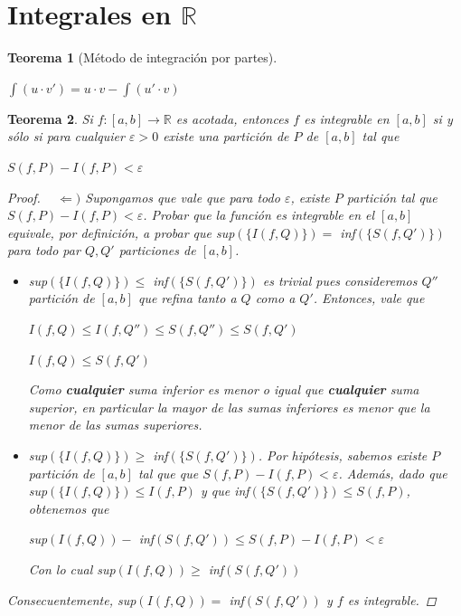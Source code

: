\documentclass[]{article}
\newtheorem{teo}{Teorema}
\def\R{\mathbb{R}}
\def\e{\varepsilon}
\begin{document}
\newpage
\section{Integrales en $\R$}
\begin{teo}[Método de integración por partes]
	~\newline
	\begin{center}
		$\displaystyle \int \! (u\cdot v') = u\cdot v - \int\!(u'\cdot v)$
	\end{center}
\end{teo}

\begin{teo}
	Si $f:[a,b]\to\R$ es acotada, entonces $f$ es integrable en $[a,b]$ si y sólo si para cualquier $\e >0$ existe una partición de $P$ de $[a,b]$ tal que 
	\begin{center}
		$S(f,P) - I(f,P) < \e$
	\end{center}
	\begin{proof}
		~\newline
		$\Leftarrow)$ Supongamos que vale que para todo $\e$, existe $P$ partición tal que $S(f,P) - I(f,P)<\e$. Probar que la función es integrable en el $[a,b]$ equivale, por definición, a probar que sup$(\{I(f,Q)\}) = $ inf$(\{S(f,Q')\})$ para todo par $Q,Q'$ particiones de $[a,b]$.
		\begin{itemize}
			\item sup$(\{I(f,Q)\}) \leq $ inf$(\{S(f,Q')\})$ es trivial pues consideremos $Q''$ partición de $[a,b]$ que refina tanto a $Q$ como a $Q'$. Entonces, vale que 
			\begin{center}
				$I(f,Q) \leq I(f,Q'') \leq S(f,Q'') \leq S(f,Q')$
			\end{center}
			\begin{center}
				$I(f,Q) \leq S(f,Q')$
			\end{center}
			Como \textbf{cualquier} suma inferior es menor o igual que \textbf{cualquier} suma superior, en particular la mayor de las sumas inferiores es menor que la menor de las sumas superiores.
			
			\item sup$(\{I(f,Q)\}) \geq $ inf$(\{S(f,Q')\})$. Por hipótesis, sabemos existe $P$ partición de $[a,b]$ tal que que $S(f,P) - I(f,P) < \e$. Además, dado que sup$(\{I(f,Q)\}) \leq I(f,P)$ y que inf$(\{S(f,Q')\}) \leq S(f,P)$, obtenemos que
			\begin{center}
				sup$({I(f,Q)}) - $ inf$({S(f,Q')}) \leq S(f,P) - I(f,P) < \e$
			\end{center}
			Con lo cual sup$({I(f,Q)}) \geq $ inf$({S(f,Q')})$
		\end{itemize}
		Consecuentemente, sup$({I(f,Q)}) = $ inf$({S(f,Q')})$ y $f$ es integrable.
		

\end{proof}
\end{teo}
\end{document}
